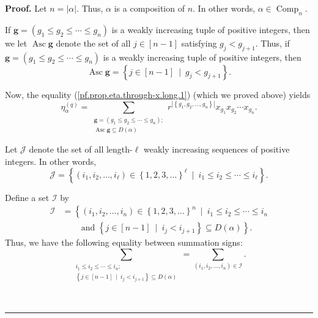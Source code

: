 \documentclass[numbers=enddot,12pt,final,onecolumn,notitlepage]{scrartcl}%
\theoremstyle{definition}
\newenvironment{proof}[1][Proof]{\noindent\textbf{#1.} }{\ \rule{0.5em}{0.5em}}
\let\sumnonlimits\sum
\renewcommand{\sum}{\sumnonlimits\limits}
\newenvironment{verlong}{}{}
\begin{document}
\begin{verlong}


\begin{proof}
Let $n=\left\vert \alpha\right\vert $. Thus, $\alpha$ is a composition of $n$.
In other words, $\alpha\in\operatorname*{Comp}\nolimits_{n}$.

If $\mathbf{g}=\left(  g_{1}\leq g_{2}\leq\cdots\leq g_{n}\right)  $ is a
weakly increasing tuple of positive integers, then we let $\operatorname*{Asc}%
\mathbf{g}$ denote the set of all $j\in\left[  n-1\right]  $ satisfying
$g_{j}<g_{j+1}$. Thus, if $\mathbf{g}=\left(  g_{1}\leq g_{2}\leq\cdots\leq
g_{n}\right)  $ is a weakly increasing tuple of positive integers, then
\begin{equation}
\operatorname*{Asc}\mathbf{g}=\left\{  j\in\left[  n-1\right]  \ \mid
\ g_{j}<g_{j+1}\right\}  . \label{pf.prop.eta.through-x2.long.Asc=}%
\end{equation}


Now, the equality (\ref{pf.prop.eta.through-x.long.1}) (which we proved above)
yields%
\begin{equation}
\eta_{\alpha}^{\left(  q\right)  }=\sum_{\substack{\mathbf{g}=\left(
g_{1}\leq g_{2}\leq\cdots\leq g_{n}\right)  ;\\\operatorname*{Asc}%
\mathbf{g}\subseteq D\left(  \alpha\right)  }}r^{\left\vert \left\{
g_{1},g_{2},\ldots,g_{n}\right\}  \right\vert }x_{g_{1}}x_{g_{2}}\cdots
x_{g_{n}}. \label{pf.prop.eta.through-x2.long.1}%
\end{equation}


Let $\mathcal{J}$ denote the set of all length-$\ell$ weakly increasing
sequences of positive integers. In other words,%
\[
\mathcal{J}=\left\{  \left(  i_{1},i_{2},\ldots,i_{\ell}\right)  \in\left\{
1,2,3,\ldots\right\}  ^{\ell}\ \mid\ i_{1}\leq i_{2}\leq\cdots\leq i_{\ell
}\right\}  .
\]


Define a set $\mathcal{I}$ by%
\begin{align*}
\mathcal{I}  &  =\left\{  \left(  i_{1},i_{2},\ldots,i_{n}\right)  \in\left\{
1,2,3,\ldots\right\}  ^{n}\ \mid\ i_{1}\leq i_{2}\leq\cdots\leq i_{n}\right.
\\
&  \ \ \ \ \ \ \ \ \ \ \left.  \text{and }\left\{  j\in\left[  n-1\right]
\ \mid\ i_{j}<i_{j+1}\right\}  \subseteq D\left(  \alpha\right)  \right\}  .
\end{align*}
Thus, we have the following equality between summation signs:%
\begin{equation}
\sum_{\substack{i_{1}\leq i_{2}\leq\cdots\leq i_{n};\\\left\{  j\in\left[
n-1\right]  \ \mid\ i_{j}<i_{j+1}\right\}  \subseteq D\left(  \alpha\right)
}}=\sum_{\left(  i_{1},i_{2},\ldots,i_{n}\right)  \in\mathcal{I}}.
\label{pf.prop.eta.through-x2.long.fact1}%
\end{equation}



\end{proof}
\end{verlong}
\end{document}
